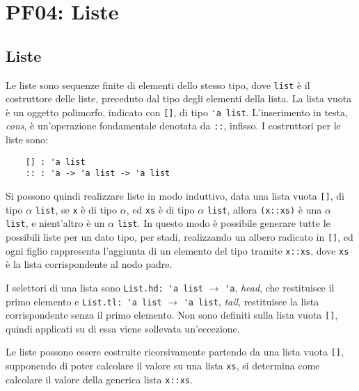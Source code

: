 \documentclass{article}
\numberwithin{equation}{subsection}
\begin{document}
\clearpage

\section{PF04: Liste}

\subsection{Liste}


Le liste sono sequenze finite di elementi dello stesso tipo, dove \verb|list| è il costruttore delle liste, preceduto dal tipo degli elementi della lista. La lista vuota è un oggetto polimorfo, indicato con \verb|[]|, di tipo \verb|'a list|. L'inserimento in testa, \textit{cons}, è un'operazione fondamentale denotata da \verb|::|, infisso. I costruttori per le liste sono:
\begin{verbatim} 
    [] : 'a list
    :: : 'a -> 'a list -> 'a list
\end{verbatim}
Si possono quindi realizzare liste in modo induttivo, data una lista vuota \verb|[]|, di tipo $\alpha$ \verb|list|, se \verb|x| è di tipo $\alpha$, ed \verb|xs| è di tipo $\alpha$ \verb|list|, allora \verb|(x::xs)| è una $\alpha$ \verb|list|, e nient'altro è un $\alpha$ \verb|list|. 
In questo modo è possibile generare tutte le possibili liste per un dato tipo, per stadi, realizzando un albero radicato in \verb|[]|, ed ogni figlio rappresenta l'aggiunta di un elemento del tipo tramite \verb|x::xs|, dove \verb|xs| è la lista corrispondente al nodo padre. 

I selettori di una lista sono \verb|List.hd: 'a list| $\rightarrow$ \verb|'a|, \textit{head}, che restituisce il primo elemento e \verb|List.tl: 'a list| $\rightarrow$ \verb|'a list|, \textit{tail}, restituisce la lista corrispondente senza il primo elemento. Non sono definiti sulla lista vuota \verb|[]|, quindi applicati su di essa viene sollevata un'eccezione.  

Le liste possono essere costruite ricorsivamente partendo da una lista vuota \verb|[]|, supponendo di poter calcolare il valore su una lista \verb|xs|, si determina come calcolare il valore della generica lista \verb|x::xs|. 
\end{document}
